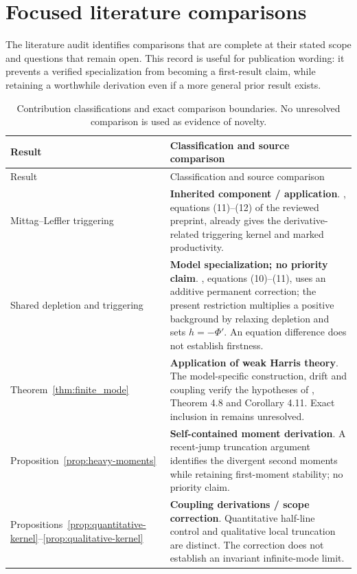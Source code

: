\chapter{Focused literature comparisons}
\label{app:literature_status}

The literature audit identifies comparisons that are complete at their stated scope and questions that remain open. This record is useful for publication wording: it prevents a verified specialization from becoming a first-result claim, while retaining a worthwhile derivation even if a more general prior result exists.

\begin{longtable}{@{}>{\raggedright\arraybackslash}p{}>{\raggedright\arraybackslash}p{}@{}}
\caption{Contribution classifications and exact comparison boundaries. No unresolved comparison is used as evidence of novelty.}\label{tab:contribution-classification}\\
\toprule Result & Classification and source comparison \\ \midrule\endfirsthead
\toprule Result & Classification and source comparison \\ \midrule\endhead
Mittag--Leffler triggering & \textbf{Inherited component / application}. \citet{DavisBaeumerWang2024}, equations (11)--(12) of the reviewed preprint, already gives the derivative-related triggering kernel and marked productivity. \\
Shared depletion and triggering & \textbf{Model specialization; no priority claim}. \citet{PetrilloZhuangLippiello2023}, equations (10)--(11), uses an additive permanent correction; the present restriction multiplies a positive background by relaxing depletion and sets \(h=-\Phi'\). An equation difference does not establish firstness. \\
Theorem~\ref{thm:finite_mode} & \textbf{Application of weak Harris theory}. The model-specific construction, drift and coupling verify the hypotheses of \citet{HairerMattinglyScheutzow2011}, Theorem 4.8 and Corollary 4.11. Exact inclusion in \citet{BremaudMassoulie1996} remains unresolved. \\
Proposition~\ref{prop:heavy-moments} & \textbf{Self-contained moment derivation}. A recent-jump truncation argument identifies the divergent second moments while retaining first-moment stability; no priority claim. \\
Propositions~\ref{prop:quantitative-kernel}--\ref{prop:qualitative-kernel} & \textbf{Coupling derivations / scope correction}. Quantitative half-line control and qualitative local truncation are distinct. The correction does not establish an invariant infinite-mode limit. \\

\end{longtable}
